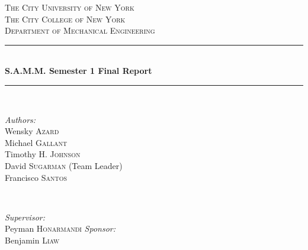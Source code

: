 \documentclass[12pt,letterpaper,notitlepage]{article}
\begin{document}
\begin{titlepage}

\newcommand{\HRule}{\rule{\linewidth}{0.5mm}} %

\center %


\textsc{\LARGE The City University of New York}\\[1cm] %
\textsc{\Large The City College of New York}\\[0.5cm] %
\textsc{\large Department of Mechanical Engineering}\\[0.5cm] %


\HRule \\[0.4cm]
{ \huge \bfseries S.A.M.M. Semester 1 Final Report}\\[0.4cm] %
\HRule \\[1.5cm]


\begin{minipage}{0.4\textwidth}
\begin{flushleft} \large
\emph{Authors:}\\
Wensky \textsc{Azard}\\
Michael \textsc{Gallant}\\
Timothy H. \textsc{Johnson}\\
David \textsc{Sugarman} (Team Leader)\\
Francisco \textsc{Santos}
\end{flushleft}
\end{minipage}
~
\begin{minipage}{0.4\textwidth}
\begin{flushright} \large
\emph{Supervisor:} \\
Peyman \textsc{Honarmandi} %
\emph{Sponsor:} \\
Benjamin \textsc{Liaw}
\end{flushright}
\end{minipage}\\[2cm]


\end{titlepage}
\end{document}
